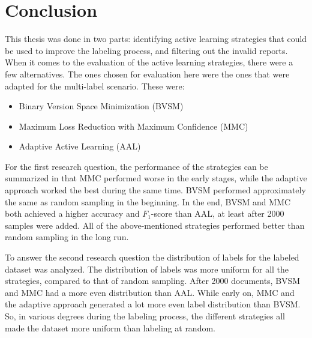 
\chapter{Conclusion}
\label{cha:conclusion}

This thesis was done in two parts: identifying active learning strategies that could be used to improve the labeling process, and filtering out the invalid reports.
When it comes to the evaluation of the active learning strategies, there were a few alternatives.
The ones chosen for evaluation here were the ones that were adapted for the multi-label scenario.
These were: 
\begin{itemize}
    \item Binary Version Space Minimization (BVSM)
    \item Maximum Loss Reduction with Maximum Confidence (MMC)
    \item Adaptive Active Learning (AAL)
\end{itemize}

For the first research question, the performance of the strategies can be summarized in that MMC performed worse in the early stages, while the adaptive approach worked the best during the same time.
BVSM performed approximately the same as random sampling in the beginning.
In the end, BVSM and MMC both achieved a higher accuracy and $F_1$-score than AAL, at least after 2000 samples were added.
All of the above-mentioned strategies performed better than random sampling in the long run.

To answer the second research question the distribution of labels for the labeled dataset was analyzed.
The distribution of labels was more uniform for all the strategies, compared to that of random sampling.
After 2000 documents, BVSM and MMC had a more even distribution than AAL.
While early on, MMC and the adaptive approach generated a lot more even label distribution than BVSM.
So, in various degrees during the labeling process, the different strategies all made the dataset more uniform than labeling at random.

